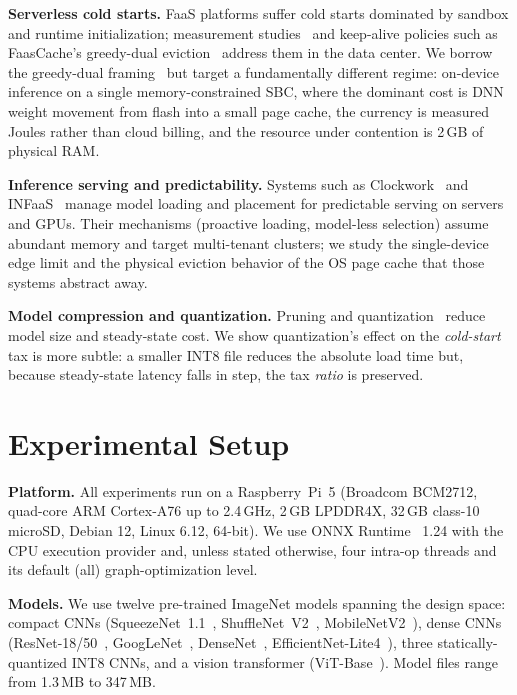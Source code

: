 \documentclass[journal]{IEEEtran}
\begin{document}
\textbf{Serverless cold starts.} FaaS platforms suffer cold starts dominated by sandbox and
runtime initialization; measurement studies~\cite{wang2018peeking,shahrad2020serverless} and
keep-alive policies such as FaasCache's greedy-dual eviction~\cite{fuerst2021faascache} address
them in the data center. We borrow the greedy-dual framing~\cite{cao1997greedydual} but target a
fundamentally different regime: on-device inference on a single memory-constrained SBC, where the
dominant cost is DNN weight movement from flash into a small page cache, the currency is measured
Joules rather than cloud billing, and the resource under contention is 2\,GB of physical RAM.

\textbf{Inference serving and predictability.} Systems such as Clockwork~\cite{gujarati2020clockwork}
and INFaaS~\cite{romero2021infaas} manage model loading and placement for predictable serving on
servers and GPUs. Their mechanisms (proactive loading, model-less selection) assume abundant
memory and target multi-tenant clusters; we study the single-device edge limit and the physical
eviction behavior of the OS page cache that those systems abstract away.

\textbf{Model compression and quantization.} Pruning and
quantization~\cite{han2016deepcompression,jacob2018quantization} reduce model size and
steady-state cost. We show quantization's effect on the \emph{cold-start} tax is more subtle: a
smaller INT8 file reduces the absolute load time but, because steady-state latency falls in
step, the tax \emph{ratio} is preserved.

\section{Experimental Setup}\label{sec:setup}
\textbf{Platform.} All experiments run on a Raspberry~Pi~5 (Broadcom BCM2712, quad-core ARM
Cortex-A76 up to 2.4\,GHz, 2\,GB LPDDR4X, 32\,GB class-10 microSD, Debian 12, Linux
6.12, 64-bit). We use ONNX Runtime~\cite{onnxruntime} 1.24 with the CPU execution provider and,
unless stated otherwise, four intra-op threads and its default (all) graph-optimization level.

\textbf{Models.} We use twelve pre-trained ImageNet models spanning the design space: compact
CNNs (SqueezeNet~1.1~\cite{iandola2016squeezenet}, ShuffleNet~V2~\cite{ma2018shufflenetv2},
MobileNetV2~\cite{sandler2018mobilenetv2}), dense CNNs (ResNet-18/50~\cite{he2016resnet},
GoogLeNet~\cite{szegedy2015googlenet}, DenseNet~\cite{huang2017densenet},
EfficientNet-Lite4~\cite{tan2019efficientnet}), three statically-quantized INT8 CNNs, and a
vision transformer (ViT-Base~\cite{dosovitskiy2021vit}). Model files range from
1.3\,MB to 347\,MB.
\end{document}
